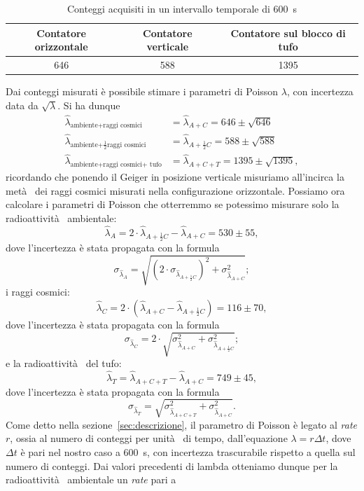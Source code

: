 \documentclass[10pt,oneside,a4paper]{article}
\begin{document}
\begin{table}[ht]
\caption{Conteggi acquisiti in un intervallo temporale di \SI{600}{s}}
\label{tab:conteggi600s}
\centering
\begin{tabular}{ccc}
\toprule
Contatore orizzontale & Contatore verticale & Contatore sul blocco di tufo \\
\hline 
646 & 588 & 1395 \\
\bottomrule
\end{tabular}
\end{table}

Dai conteggi misurati è possibile stimare i parametri di Poisson $\lambda$, con incertezza data da $\sqrt{\lambda}$. Si ha dunque
\begin{align*}
\hat{\lambda}_{\text{ambiente+raggi cosmici}} &= \hat{\lambda}_{A+C} = 646 \pm \sqrt{646} \\
\hat{\lambda}_{\text{ambiente+$\frac{1}{2}$raggi cosmici}} &= \hat{\lambda}_{A+\frac{1}{2}C} = 588 \pm \sqrt{588} \\
\hat{\lambda}_{\text{ambiente+raggi cosmici+ tufo}} &= \hat{\lambda}_{A+C+T} = 1395 \pm \sqrt{1395}, 
\end{align*}
ricordando che ponendo il Geiger in posizione verticale misuriamo all'incirca la metà  dei raggi cosmici misurati nella configurazione orizzontale. Possiamo ora calcolare i parametri di Poisson che otterremmo se potessimo misurare solo la radioattività  ambientale: 
\[
\hat{\lambda}_A = 2\cdot\hat{\lambda}_{A+\frac{1}{2}C}-\hat{\lambda}_{A+C} = 530 \pm 55,
\]
dove l'incertezza è stata propagata con la formula
\[
\sigma_{\hat{\lambda}_A} = \sqrt{\left(2\cdot\sigma_{\hat{\lambda}_{A+\frac{1}{2}C}}\right)^2+\sigma_{\hat{\lambda}_{A+C}}^2};
\]
i raggi cosmici:
\[
\hat{\lambda}_C = 2\cdot (\hat{\lambda}_{A+C} - \hat{\lambda}_{A+\frac{1}{2}C}) = 116 \pm 70,
\]
dove l'incertezza è stata propagata con la formula
\[
\sigma_{\hat{\lambda}_C} = 2\cdot\sqrt{\sigma_{\hat{\lambda}_{A+C}}^2+\sigma_{\hat{\lambda}_{A+\frac{1}{2}C}}^2};
\]
e la radioattività  del tufo:
\[
\hat{\lambda}_T = \hat{\lambda}_{A+C+T} - \hat{\lambda}_{A+C} = 749 \pm 45,
\]
dove l'incertezza è stata propagata con la formula
\[
\sigma_{\hat{\lambda}_{T}} = \sqrt{\sigma_{\hat{\lambda}_{A+C+T}}^2+\sigma_{\hat{\lambda}_{A+C}}^2}.
\]
Come detto nella sezione~\ref{sec:descrizione}, il parametro di Poisson è legato al \emph{rate} $r$, ossia al numero di conteggi per unità  di tempo, dall'equazione $\lambda = r\Delta t$, dove $\Delta t$ è pari nel nostro caso a \SI{600}{s}, con incertezza trascurabile rispetto a quella sul numero di conteggi. Dai valori precedenti di lambda otteniamo dunque per la radioattività  ambientale un \emph{rate} pari a
\end{document}
